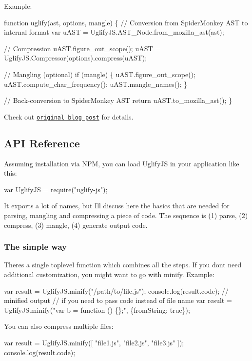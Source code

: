 Example\+:


\begin{DoxyCode}
function uglify(ast, options, mangle) \{
  // Conversion from SpiderMonkey AST to internal format
  var uAST = UglifyJS.AST\_Node.from\_mozilla\_ast(ast);

  // Compression
  uAST.figure\_out\_scope();
  uAST = UglifyJS.Compressor(options).compress(uAST);

  // Mangling (optional)
  if (mangle) \{
    uAST.figure\_out\_scope();
    uAST.compute\_char\_frequency();
    uAST.mangle\_names();
  \}

  // Back-conversion to SpiderMonkey AST
  return uAST.to\_mozilla\_ast();
\}
\end{DoxyCode}


Check out \href{http://rreverser.com/using-mozilla-ast-with-uglifyjs/}{\tt original blog post} for details.

\subsection*{A\+PI Reference }

Assuming installation via N\+PM, you can load Uglify\+JS in your application like this\+: 
\begin{DoxyCode}
var UglifyJS = require("uglify-js");
\end{DoxyCode}


It exports a lot of names, but I\textquotesingle{}ll discuss here the basics that are needed for parsing, mangling and compressing a piece of code. The sequence is (1) parse, (2) compress, (3) mangle, (4) generate output code.

\subsubsection*{The simple way}

There\textquotesingle{}s a single toplevel function which combines all the steps. If you don\textquotesingle{}t need additional customization, you might want to go with {\ttfamily minify}. Example\+: 
\begin{DoxyCode}
var result = UglifyJS.minify("/path/to/file.js");
console.log(result.code); // minified output
// if you need to pass code instead of file name
var result = UglifyJS.minify("var b = function () \{\};", \{fromString: true\});
\end{DoxyCode}


You can also compress multiple files\+: 
\begin{DoxyCode}
var result = UglifyJS.minify([ "file1.js", "file2.js", "file3.js" ]);
console.log(result.code);
\end{DoxyCode}


